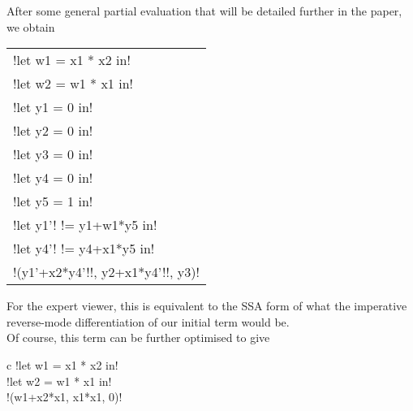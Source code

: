 \begin{example}
After some general partial evaluation that will be detailed further in the paper, we obtain     
        \begin{center}
            \begin{tabular}{l}
                !let w1 = x1 * x2 in!\\ 
                !let w2 = w1 * x1 in!\\
                !let y1 = 0 in!\\
                !let y2 = 0 in!\\
                !let y3 = 0 in!\\
                !let y4 = 0 in!\\
                !let y5 = 1 in!\\
                !let y1'! != y1+w1*y5 in!\\
                !let y4'! != y4+x1*y5 in!\\
                !(y1'+x2*y4'!!, y2+x1*y4'!!, y3)!
            \end{tabular}
        \end{center}  
For the expert viewer, this is equivalent to the SSA form \cite{cytron1989efficient} of what the imperative reverse-mode differentiation of our initial term would be.\\
Of course, this term can be further optimised to give
        \begin{center}
            \begin{tabular}{{c}}
                !let w1 = x1 * x2 in!\\ 
                !let w2 = w1 * x1 in!\\
                !(w1+x2*x1, x1*x1, 0)!
            \end{tabular}
        \end{center}
    \end{example}

